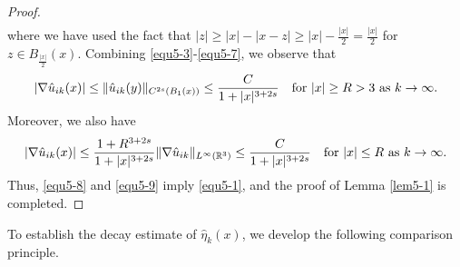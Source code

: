 \documentclass[reqno, 11pt]{amsart} %
\numberwithin{equation}{section}
\begin{document}
\begin{proof}
\begin{equation}
\begin{split}
			\end{split}
		\end{equation}
		where we have used the fact that $|z|\geq|x|-|x-z|\geq|x|-\frac{|x|}{2}=\frac{|x|}{2}$ for $z\in B_{\frac{|x|}{2}}(x)$. Combining \eqref{equ5-3}-\eqref{equ5-7}, we observe that
		\begin{equation}\label{equ5-8}
			|\nabla\hat{u}_{ik}(x)|\leq\|\hat{u}_{ik}(y)\|_{C^{2s}(B_{1}(x))}\leq\frac{C}{1+|x|^{3+2s}}\quad \hbox{for $|x|\geq R>3$ as $k\rightarrow\infty$}.
		\end{equation}
		Moreover, we also have
		\begin{equation}\label{equ5-9}
			|\nabla\hat{u}_{ik}(x)|\leq\frac{1+R^{3+2s}}{1+|x|^{3+2s}}	\|\nabla\hat{u}_{ik}\|_{L^{\infty}(\mathbb{R}^{3})}\leq\frac{C}{1+|x|^{3+2s}}\quad \hbox{for $|x|\leq R$ as $k\rightarrow\infty$}.
		\end{equation}
		Thus, \eqref{equ5-8} and \eqref{equ5-9} imply \eqref{equ5-1}, and the proof of Lemma \ref{lem5-1} is completed. 
	\end{proof}
	
	
	To establish the decay estimate of $\hat{\eta}_{k}(x)$, we develop the following comparison principle.	
	
\end{document}
